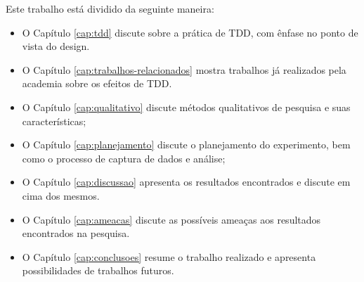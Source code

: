 Este trabalho está dividido da seguinte maneira: 

\begin{itemize}
	\item O Capítulo \ref{cap:tdd} discute sobre a prática de TDD, com ênfase no
	ponto de vista do design.
  
	\item O Capítulo \ref{cap:trabalhos-relacionados} mostra trabalhos já
	realizados pela academia sobre os efeitos de TDD.

 	\item O Capítulo \ref{cap:qualitativo} discute métodos qualitativos de
 	pesquisa e suas características;

	\item O Capítulo \ref{cap:planejamento} discute o planejamento do experimento,
	bem como o processo de captura de dados e análise;

	\item O Capítulo \ref{cap:discussao} apresenta os resultados encontrados e
	discute em cima dos mesmos.
	
	\item O Capítulo \ref{cap:ameacas} discute as possíveis ameaças aos resultados
	encontrados na pesquisa.
	
	\item O Capítulo \ref{cap:conclusoes} resume o trabalho realizado e apresenta
	possibilidades de trabalhos futuros.
\end{itemize}

